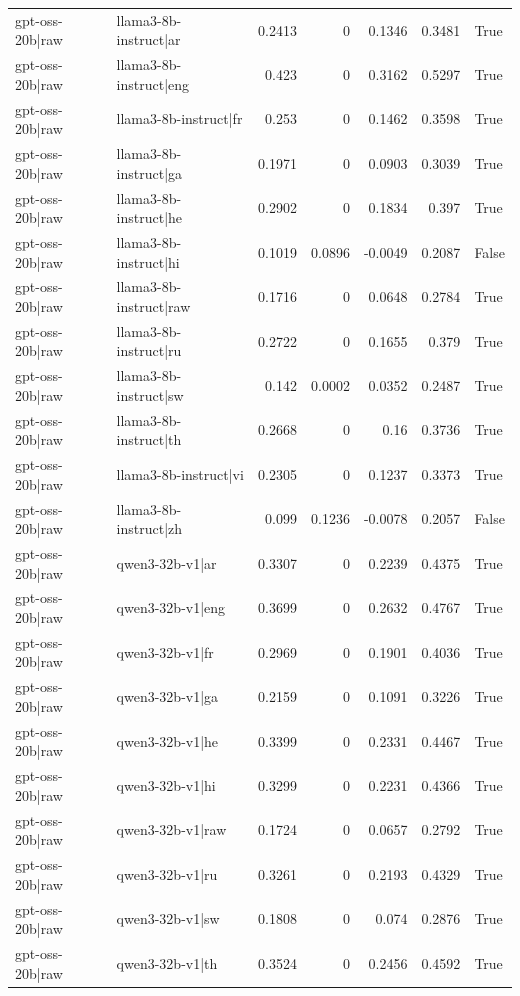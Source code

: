 \begin{table}
\begin{tabular}{l l r r r r l}
gpt-oss-20b|raw & llama3-8b-instruct|ar & 0.2413 & 0 & 0.1346 & 0.3481 & True \\
gpt-oss-20b|raw & llama3-8b-instruct|eng & 0.423 & 0 & 0.3162 & 0.5297 & True \\
gpt-oss-20b|raw & llama3-8b-instruct|fr & 0.253 & 0 & 0.1462 & 0.3598 & True \\
gpt-oss-20b|raw & llama3-8b-instruct|ga & 0.1971 & 0 & 0.0903 & 0.3039 & True \\
gpt-oss-20b|raw & llama3-8b-instruct|he & 0.2902 & 0 & 0.1834 & 0.397 & True \\
gpt-oss-20b|raw & llama3-8b-instruct|hi & 0.1019 & 0.0896 & -0.0049 & 0.2087 & False \\
gpt-oss-20b|raw & llama3-8b-instruct|raw & 0.1716 & 0 & 0.0648 & 0.2784 & True \\
gpt-oss-20b|raw & llama3-8b-instruct|ru & 0.2722 & 0 & 0.1655 & 0.379 & True \\
gpt-oss-20b|raw & llama3-8b-instruct|sw & 0.142 & 0.0002 & 0.0352 & 0.2487 & True \\
gpt-oss-20b|raw & llama3-8b-instruct|th & 0.2668 & 0 & 0.16 & 0.3736 & True \\
gpt-oss-20b|raw & llama3-8b-instruct|vi & 0.2305 & 0 & 0.1237 & 0.3373 & True \\
gpt-oss-20b|raw & llama3-8b-instruct|zh & 0.099 & 0.1236 & -0.0078 & 0.2057 & False \\
gpt-oss-20b|raw & qwen3-32b-v1|ar & 0.3307 & 0 & 0.2239 & 0.4375 & True \\
gpt-oss-20b|raw & qwen3-32b-v1|eng & 0.3699 & 0 & 0.2632 & 0.4767 & True \\
gpt-oss-20b|raw & qwen3-32b-v1|fr & 0.2969 & 0 & 0.1901 & 0.4036 & True \\
gpt-oss-20b|raw & qwen3-32b-v1|ga & 0.2159 & 0 & 0.1091 & 0.3226 & True \\
gpt-oss-20b|raw & qwen3-32b-v1|he & 0.3399 & 0 & 0.2331 & 0.4467 & True \\
gpt-oss-20b|raw & qwen3-32b-v1|hi & 0.3299 & 0 & 0.2231 & 0.4366 & True \\
gpt-oss-20b|raw & qwen3-32b-v1|raw & 0.1724 & 0 & 0.0657 & 0.2792 & True \\
gpt-oss-20b|raw & qwen3-32b-v1|ru & 0.3261 & 0 & 0.2193 & 0.4329 & True \\
gpt-oss-20b|raw & qwen3-32b-v1|sw & 0.1808 & 0 & 0.074 & 0.2876 & True \\
gpt-oss-20b|raw & qwen3-32b-v1|th & 0.3524 & 0 & 0.2456 & 0.4592 & True \\

\end{tabular}
\end{table}
